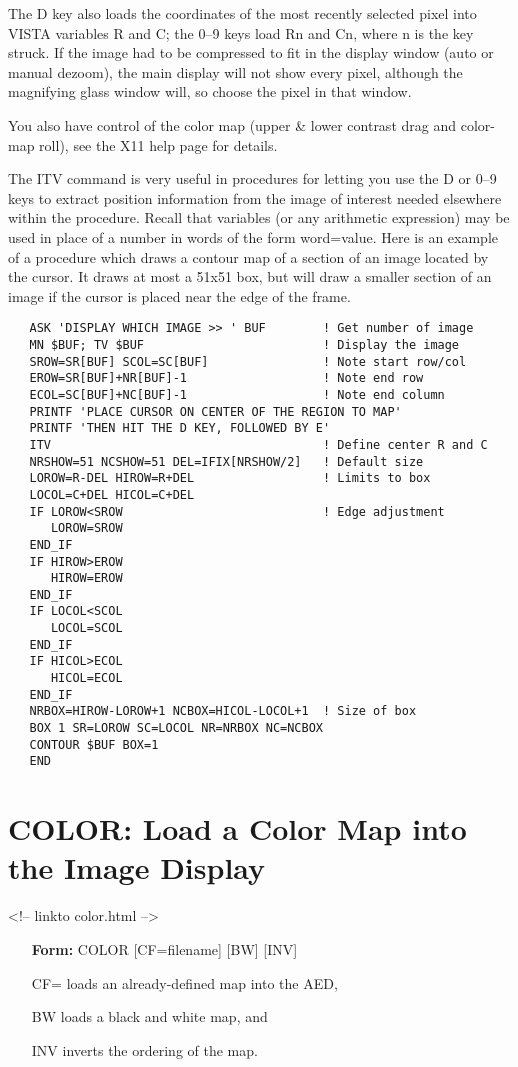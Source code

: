 The D key also loads the coordinates of the most recently selected pixel
into VISTA variables R and C; the 0--9 keys load Rn and Cn, where n is the
key struck.  If the image had to be compressed to fit in the display window
(auto or manual dezoom), the main display will not show every pixel,
although the magnifying glass window will, so choose the pixel in that
window.

You also have control of the color map (upper \& lower contrast drag and
color-map roll), see the X11 help page for details.

The ITV command is very useful in procedures for letting you use the D or
0--9 keys to extract position information from the image of interest needed
elsewhere within the procedure.  Recall that variables (or any arithmetic
expression) may be used in place of a number in words of the form
word=value.  Here is an example of a procedure which draws a contour map of
a section of an image located by the cursor.  It draws at most a 51x51 box,
but will draw a smaller section of an image if the cursor is placed near
the edge of the frame.

\begin{verbatim}
   ASK 'DISPLAY WHICH IMAGE >> ' BUF        ! Get number of image
   MN $BUF; TV $BUF                         ! Display the image
   SROW=SR[BUF] SCOL=SC[BUF]                ! Note start row/col
   EROW=SR[BUF]+NR[BUF]-1                   ! Note end row
   ECOL=SC[BUF]+NC[BUF]-1                   ! Note end column
   PRINTF 'PLACE CURSOR ON CENTER OF THE REGION TO MAP'
   PRINTF 'THEN HIT THE D KEY, FOLLOWED BY E'
   ITV                                      ! Define center R and C
   NRSHOW=51 NCSHOW=51 DEL=IFIX[NRSHOW/2]   ! Default size
   LOROW=R-DEL HIROW=R+DEL                  ! Limits to box
   LOCOL=C+DEL HICOL=C+DEL
   IF LOROW<SROW                            ! Edge adjustment
      LOROW=SROW
   END_IF
   IF HIROW>EROW
      HIROW=EROW
   END_IF
   IF LOCOL<SCOL
      LOCOL=SCOL
   END_IF
   IF HICOL>ECOL
      HICOL=ECOL
   END_IF
   NRBOX=HIROW-LOROW+1 NCBOX=HICOL-LOCOL+1  ! Size of box
   BOX 1 SR=LOROW SC=LOCOL NR=NRBOX NC=NCBOX
   CONTOUR $BUF BOX=1
   END
\end{verbatim}

\section{COLOR: Load a Color Map into the Image Display}
\begin{rawhtml}
<!-- linkto color.html -->
\end{rawhtml}
\begin{itemize}
  \item[\textbf{Form: }COLOR {[CF=filename]} {[BW]} {[INV]}\hfill]{}
  \item[CF=]{loads an already-defined map into the AED,}
  \item[BW]{loads a black and white map, and}
  \item[INV]{inverts the ordering of the map.}
\end{itemize}

